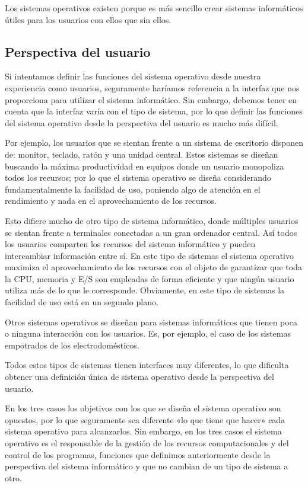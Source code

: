 Los sistemas operativos existen porque es más sencillo crear sistemas
informáticos útiles para los usuarios con ellos que sin ellos.

\subsection{Perspectiva del usuario}\label{_perspectiva_del_usuario}

Si intentamos definir las funciones del sistema operativo desde nuestra
experiencia como usuarios, seguramente haríamos referencia a la interfaz
que nos proporciona para utilizar el sistema informático. Sin embargo,
debemos tener en cuenta que la interfaz varía con el tipo de sistema,
por lo que definir las funciones del sistema operativo desde la
perspectiva del usuario es mucho más difícil.

Por ejemplo, los usuarios que se sientan frente a un sistema de
escritorio disponen de: monitor, teclado, ratón y una unidad central.
Estos sistemas se diseñan buscando la máxima productividad en equipos
donde un usuario monopoliza todos los recursos; por lo que el sistema
operativo se diseña considerando fundamentalmente la facilidad de uso,
poniendo algo de atención en el rendimiento y nada en el aprovechamiento
de los recursos.

Esto difiere mucho de otro tipo de sistema informático, donde múltiples
usuarios se sientan frente a terminales conectadas a un gran ordenador
central. Así todos los usuarios comparten los recursos del sistema
informático y pueden intercambiar información entre sí. En este tipo de
sistemas el sistema operativo maximiza el aprovechamiento de los
recursos con el objeto de garantizar que toda la CPU, memoria y E/S son
empleadas de forma eficiente y que ningún usuario utiliza más de lo que
le corresponde. Obviamente, en este tipo de sistemas la facilidad de uso
está en un segundo plano.

Otros sistemas operativos se diseñan para sistemas informáticos que
tienen poca o ninguna interacción con los usuarios. Es, por ejemplo, el
caso de los sistemas empotrados de los electrodomésticos.

Todos estos tipos de sistemas tienen interfaces muy diferentes, lo que
dificulta obtener una definición única de sistema operativo desde la
perspectiva del usuario.

En los tres casos los objetivos con los que se diseña el sistema
operativo son opuestos, por lo que seguramente sea diferente «lo que
tiene que hacer» cada sistema operativo para alcanzarlos. Sin embargo,
en los tres casos el sistema operativo es el responsable de la gestión
de los recursos computacionales y del control de los programas,
funciones que definimos anteriormente desde la perspectiva del sistema
informático y que no cambian de un tipo de sistema a otro.
